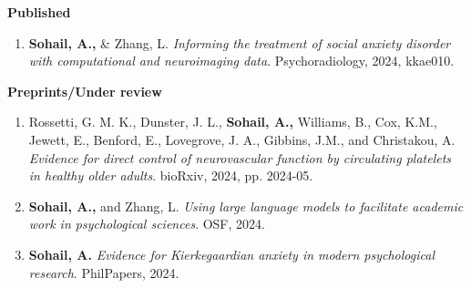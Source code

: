 \setcounter{papercount}{0}

\textbf{Published}
\begin{enumerate}[]
\item \textbf{Sohail, A.,} \& Zhang, L. \textit{Informing the treatment of social anxiety disorder with computational and neuroimaging data}. Psychoradiology, 2024, kkae010.
\end{enumerate}

\vspace{0.5em}
\textbf{Preprints/Under review}
\begin{enumerate}[]
\item Rossetti, G. M. K., Dunster, J. L., \textbf{Sohail, A.,} Williams, B., Cox, K.M., Jewett, E., Benford, E., Lovegrove, J. A., Gibbins, J.M., and Christakou, A. \textit{Evidence for direct control of neurovascular function by circulating platelets in healthy older adults}. bioRxiv, 2024, pp. 2024-05.

\item \textbf{Sohail, A.,} and Zhang, L. \textit{Using large language models to facilitate academic work in psychological sciences}. OSF, 2024.

\item \textbf{Sohail, A.} \textit{Evidence for Kierkegaardian anxiety in modern psychological research}. PhilPapers, 2024.
\end{enumerate}